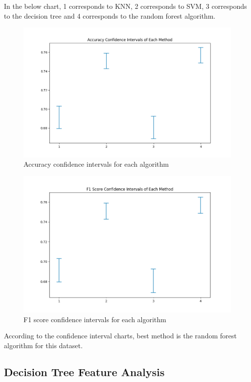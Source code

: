 \documentclass[12pt,a4paper, margin=1in]{article}
\begin{document}
In the below chart, 1 corresponds to KNN, 2 corresponds to SVM, 3 corresponds to the decision tree and 4 corresponds to the random forest algorithm.

\begin{figure}[H]
    \centering
    \includegraphics[scale=0.75]{part3-acc-ci-2.png}
    \caption{Accuracy confidence intervals for each algorithm}
\end{figure}

\begin{figure}[H]
    \centering
    \includegraphics[scale=0.75]{part3-f1s-ci-2.png}
    \caption{F1 score confidence intervals for each algorithm}
\end{figure}
\bigskip

According to the confidence interval charts, best method is the random forest algorithm for this dataset.

\pagebreak

\subsection{Decision Tree Feature Analysis}
\end{document}
